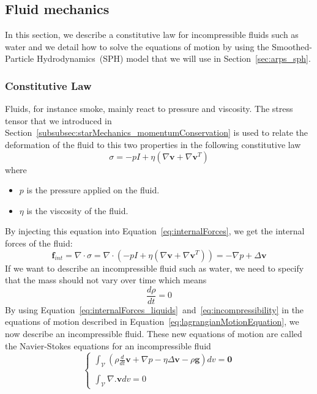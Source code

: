 \subsection{Fluid mechanics}
\label{subsec:fluidMechanics}
In this section, we describe a constitutive law for incompressible fluids such as water and we detail how to solve the equations of motion by using the Smoothed-Particle Hydrodynamics~(SPH) model that we will use in Section~\ref{sec:arps_sph}.
\subsubsection{Constitutive Law}
Fluids, for instance smoke, mainly react to pressure and viscosity.
The stress tensor that we introduced in Section~\ref{subsubsec:starMechanics_momentumConservation} is used to relate the deformation of the fluid to this two properties in the following constitutive law
\begin{equation}
\label{eq:fluidConstitutiveLaw}
\sigma = -pI + \eta \left( \nabla \mathbf{v} + \nabla \mathbf{v}^{T} \right)
\end{equation}
where
\begin{itemize}
	\item $p$ is the pressure applied on the fluid.
	\item $\eta$ is the viscosity of the fluid.
\end{itemize}
By injecting this equation into Equation~\eqref{eq:internalForces}, we get the internal forces of the fluid:
\begin{equation}
\label{eq:internalForces_liquids}
\mathbf{f}_{int} = \nabla \cdot \sigma = \nabla \cdot \left( -pI + \eta \left( \nabla \mathbf{v} + \nabla \mathbf{v}^{T} \right) \right) = -\nabla p + \Delta \mathbf{v}
\end{equation}
If we want to describe an incompressible fluid such as water, we need to specify that the mass should not vary over time which means
\begin{equation}
\label{eq:incompressibility}
\frac{d\rho}{dt} = 0
\end{equation}
By using Equation~\eqref{eq:internalForces_liquids}~and~\eqref{eq:incompressibility} in the equations of motion described in Equation~\eqref{eq:lagrangianMotionEquation}, we now describe an incompressible fluid. These new equations of motion are called the Navier-Stokes equations for an incompressible fluid
\begin{equation}
\label{eq:navierStokes}
\left\lbrace
\begin{array}{ll}
\displaystyle \int_{\mathcal{V}} \left( \rho \frac{d}{dt} \mathbf{v} + \nabla p - \eta \Delta \mathbf{v} - \rho \mathbf{g} \right)dv = \mathbf{0}\\ \\
\displaystyle \int_{\mathcal{V}} \nabla. \mathbf{v} dv = 0
\end{array}
\right.
\end{equation}
